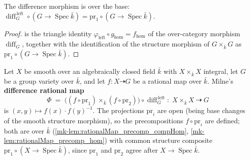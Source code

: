 \begin{lemma}\label{mk-lem:grpObjDiffLeft_comp_hom}
  \leanok

  The difference morphism is over the base: \(\operatorname{diff}_G^{\,\mathrm{left}} \circ
  (G \to \operatorname{Spec}\bar k) = \mathrm{pr}_1 \circ (G \to \operatorname{Spec}\bar k)\).
\end{lemma}
\begin{proof}
  \leanokThis is the triangle identity \(\varphi_{\mathrm{left}} \circ g_{\mathrm{hom}} =
  f_{\mathrm{hom}}\) of the over-category morphism \(\operatorname{diff}_G\), together with the
  identification of the structure morphism of \(G \times_{\bar k} G\) as
  \(\mathrm{pr}_1 \circ (G \to \operatorname{Spec}\bar k)\).
\end{proof}

\begin{definition}\label{mk-def:rationalMap_difference}
  \leanok

  Let \(X\) be smooth over an algebraically closed field \(\bar k\) with \(X \times_{\bar k} X\)
  integral, let \(G\) be a group variety over \(\bar k\), and let
  \(f \colon X \dashrightarrow G\) be a rational map over \(\bar k\). Milne's
  \textbf{difference rational map}
  \[
    \Phi \;=\; \bigl((f \circ \mathrm{pr}_1) \times_{\bar k} (f \circ \mathrm{pr}_2)\bigr)
    \circ \operatorname{diff}_G^{\,\mathrm{left}}
    \colon\; X \times_{\bar k} X \;\dashrightarrow\; G
  \]
  is \((x,y) \mapsto f(x) \cdot f(y)^{-1}\). The projections \(\mathrm{pr}_i\) are open (being
  base changes of the smooth structure morphism), so the precompositions
  \(f \circ \mathrm{pr}_i\) are defined; both are over \(\bar k\)
  (\ref{mk-lem:rationalMap_precomp_compHom}, \ref{mk-lem:rationalMap_precomp_hom}) with common
  structure composite \(\mathrm{pr}_1 \circ (X \to \operatorname{Spec}\bar k)\), since
  \(\mathrm{pr}_1\) and \(\mathrm{pr}_2\) agree after \(X \to \operatorname{Spec}\bar k\).
\end{definition}


